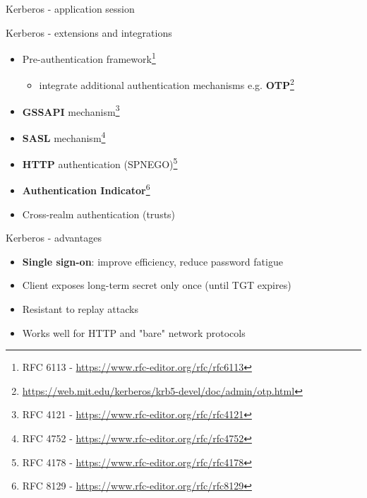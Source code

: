 \documentclass[ignorenonframetext,aspectratio=169,12pt]{beamer}
\def\svgwidth{4cm}
\begin{document}
\begin{frame}{Kerberos - application session}
\begin{center}
\def\svgwidth{\textwidth}

\end{center}
\end{frame}

\begin{frame}{Kerberos - extensions and integrations}
\protect\hypertarget{kerberos-integrations}{}

\begin{itemize}
    \item Pre-authentication framework\footnote{RFC 6113 - \url{https://www.rfc-editor.org/rfc/rfc6113}}
        \begin{itemize}
            \item integrate additional authentication mechanisms
                e.g. {\bf OTP}\footnote{\url{https://web.mit.edu/kerberos/krb5-devel/doc/admin/otp.html}}
        \end{itemize}
    \item {\bf GSSAPI} mechanism\footnote{RFC 4121 - \url{https://www.rfc-editor.org/rfc/rfc4121}}
    \item {\bf SASL} mechanism\footnote{RFC 4752 - \url{https://www.rfc-editor.org/rfc/rfc4752}}
    \item {\bf HTTP} authentication (SPNEGO)\footnote{RFC 4178 - \url{https://www.rfc-editor.org/rfc/rfc4178}}
    \item {\bf Authentication Indicator}\footnote{RFC 8129 - \url{https://www.rfc-editor.org/rfc/rfc8129}}
    \item Cross-realm authentication (trusts)
\end{itemize}

\end{frame}

\begin{frame}{Kerberos - advantages}
\protect\hypertarget{kerberos-advantages}{}

\begin{itemize}
    \item {\bf Single sign-on}: improve efficiency, reduce password fatigue
    \item Client exposes long-term secret only once (until TGT expires)
    \item Resistant to replay attacks
    \item Works well for HTTP and "bare" network protocols
\end{itemize}

\end{frame}
\end{document}
